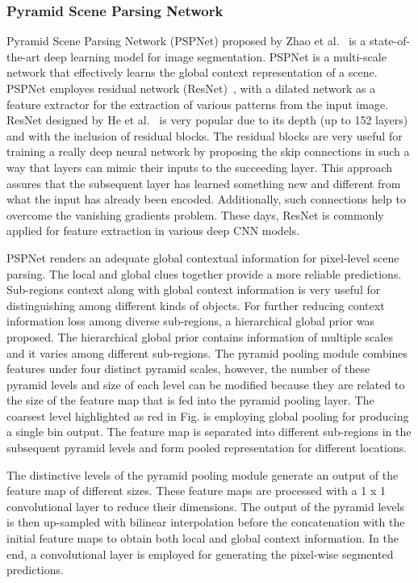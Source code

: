 \subsubsection{Pyramid Scene Parsing Network}
	Pyramid Scene Parsing Network (PSPNet) proposed by Zhao et al.~\cite{zhao2017pyramid} is a state-of-the-art deep learning model for image segmentation. PSPNet is a multi-scale network that effectively learns the global context representation of a scene. PSPNet employes residual network (ResNet)~\cite{he2016deep}, with a dilated network as a feature extractor for the extraction of various patterns from the input image. ResNet designed by He et al.~\cite{he2016deep} is very popular due to its depth (up to 152 layers) and with the inclusion of residual blocks. The residual blocks are very useful for training a really deep neural network by proposing the skip connections in such a way that layers can mimic their inputs to the succeeding layer. 
	This approach assures that the subsequent layer has learned something new and different from what the input has already been encoded. Additionally, such connections help to overcome the vanishing gradients problem. These days, ResNet is commonly applied for feature extraction in various deep CNN models. 
	
	PSPNet renders an adequate global contextual information for pixel-level scene parsing. The local and global clues together provide a more reliable predictions. Sub-regions context along with global context information is very useful for distinguishing among different kinds of objects. For further reducing context information loss among diverse sub-regions, a hierarchical global prior was proposed. The hierarchical global prior contains information of multiple scales and it varies among different sub-regions. The pyramid pooling module combines features under four distinct pyramid scales, however, the number of these pyramid levels and size of each level can be modified because they are related to the size of the feature map that is fed into the pyramid pooling layer. The coarsest level highlighted as red in Fig. is employing global pooling for producing a single bin output. The feature map is separated into different sub-regions in the subsequent pyramid levels and form pooled representation for different locations.
	
	The distinctive levels of the pyramid pooling module generate an output of the feature map of different sizes. These feature maps are processed with a 1 x 1 convolutional layer to reduce their dimensions. The output of the pyramid levels is then up-sampled with bilinear interpolation before the concatenation with the initial feature maps to obtain both local and global context information. In the end, a convolutional layer is employed for generating the pixel-wise segmented predictions. 
	
